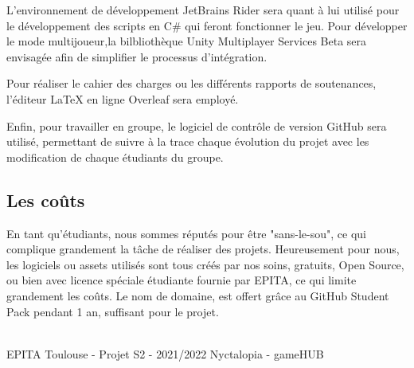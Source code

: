 L’environnement de développement JetBrains Rider sera quant à lui utilisé pour le développement des scripts en C\# qui feront fonctionner le jeu. Pour développer le mode multijoueur,la bilbliothèque Unity Multiplayer Services Beta sera envisagée afin de simplifier le processus d'intégration.


Pour réaliser le cahier des charges ou les différents rapports de soutenances, l'éditeur \LaTeX{} en ligne Overleaf sera employé.


Enfin, pour travailler en groupe, le logiciel de contrôle de version GitHub sera utilisé, permettant de suivre à la trace chaque évolution du projet avec les modification de chaque étudiants du groupe.

\subsection{Les coûts}
En tant qu'étudiants, nous sommes réputés pour être "sans-le-sou", ce qui complique grandement la tâche de réaliser des projets. Heureusement pour nous, les logiciels ou assets utilisés sont tous créés par nos soins, gratuits, Open Source, ou bien avec licence spéciale étudiante fournie par EPITA, ce qui limite grandement les coûts.
Le nom de domaine, est offert grâce au GitHub Student Pack pendant 1 an, suffisant pour le projet.

\vfill
\noindent\makebox[\linewidth]{\rule{.8\paperwidth}{.6pt}}\\[0.2cm]
EPITA Toulouse - Projet S2 - 2021/2022 \hfill Nyctalopia - gameHUB
\noindent\makebox[\linewidth]{\rule{.8\paperwidth}{.6pt}}

\newpage